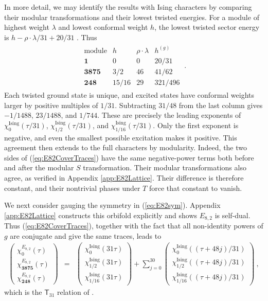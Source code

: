 \documentclass[12pt]{article}
\numberwithin{equation}{section}
\newcommand{\bea}{\begin{eqnarray}}
\newcommand{\eea}{\end{eqnarray}}
\theoremstyle{remark}
\begin{document}
In more detail, we may identify the results with Ising characters by comparing their modular transformations and their lowest twisted energies.
For a module of highest weight $\lambda$ and lowest conformal weight $h$, the lowest twisted sector energy is $h-\rho\cdot\lambda/31+20/31$ \cite{Lam:2016sss}. Thus
\bea
\begin{array}{c|c|c|c}
\text{module}&h&\rho\cdot\lambda&h^{(g)}\\ \hline
\mathbf1&0&0&20/31\\
\mathbf{3875}&3/2&46&41/62\\
\mathbf{248}&15/16&29&321/496
\end{array}~.
\eea
Each twisted ground state is unique, and excited states have conformal weights larger by positive multiples of $1/31$. Subtracting $31/48$ from the last column gives $-1/1488$, $23/1488$, and $1/744$. These are precisely the leading exponents of $\chi^{\mathrm{Ising}}_0(\tau/31)$, $\chi^{\mathrm{Ising}}_{1/2}(\tau/31)$, and $\chi^{\mathrm{Ising}}_{1/16}(\tau/31)$. Only the first exponent is negative, and even the smallest possible excitation makes it positive.
This agreement then extends to the full characters by modularity. Indeed, the two sides of (\ref{eq:E82CoverTraces}) have the same negative-power terms both before and after the modular $S$ transformation. Their modular transformations also agree, as verified in Appendix \ref{app:E82Lattice}. Their difference is therefore constant, and their nontrivial phases under $T$ force that constant to vanish.

We next consider gauging the symmetry in (\ref{eq:E82sym}).  Appendix \ref{app:E82Lattice} constructs this orbifold explicitly and shows $E_{8,2}$ is self-dual. 
Thus (\ref{eq:E82CoverTraces}), together with the fact that all non-identity powers of $g$ are conjugate and give the same traces, leads to 
\bea
\begin{pmatrix}
\chi^{E_{8,2}}_0(\tau)\\
\chi^{E_{8,2}}_{\mathbf{3875}}(\tau)\\
\chi^{E_{8,2}}_{\mathbf{248}}(\tau)
\end{pmatrix}
&=&\begin{pmatrix}
\chi^{\mathrm{Ising}}_0(31\tau)\\
\chi^{\mathrm{Ising}}_{1/2}(31\tau)\\
\chi^{\mathrm{Ising}}_{1/16}(31\tau)
\end{pmatrix}
+\sum_{j=0}^{30}\begin{pmatrix}
\chi^{\mathrm{Ising}}_0((\tau+48j)/31)\\
\chi^{\mathrm{Ising}}_{1/2}((\tau+48j)/31)\\
\chi^{\mathrm{Ising}}_{1/16}((\tau+48j)/31)
\end{pmatrix}~,
\eea
which is the $\mathsf T_{31}$ relation of \cite{Harvey:2018rdc}.
\end{document}
